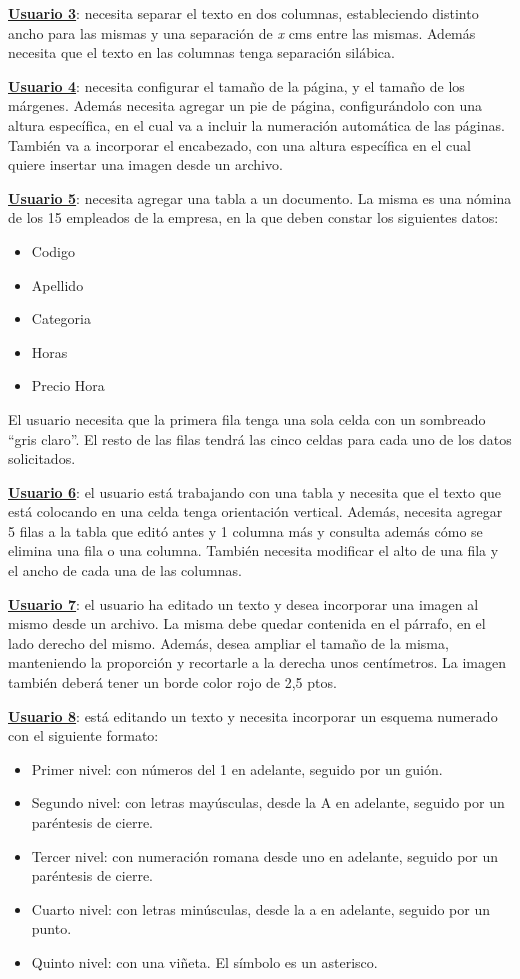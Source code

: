 \documentclass[12pt]{article}
\begin{document}
\textbf{\underline{Usuario 3}}: necesita separar el texto en dos columnas, estableciendo distinto ancho para las mismas y una separación de \textit{x} cms entre las mismas. Además necesita que el texto en las columnas tenga separación silábica.

\textbf{\underline{Usuario 4}}: necesita configurar el tamaño de la página, y el tamaño de los márgenes. Además necesita agregar un pie de página, configurándolo con una altura específica, en el cual va a incluir la numeración automática de las páginas. También va a incorporar el encabezado, con una altura específica en el cual quiere insertar una imagen desde un archivo.

\textbf{\underline{Usuario 5}}: necesita agregar una tabla a un documento. La misma es una nómina de los 15 empleados de la empresa, en la que deben constar los siguientes datos:
\begin{itemize}
\item Codigo 
\item Apellido 
\item Categoria 
\item Horas 
\item Precio Hora 
\end{itemize}
El usuario necesita que la primera fila tenga una sola celda con un sombreado “gris claro”. El resto de las filas tendrá las cinco celdas para cada uno de los datos solicitados.

\textbf{\underline{Usuario 6}}: el usuario está trabajando con una tabla y necesita que el texto que está colocando en una celda tenga orientación vertical. Además, necesita agregar 5 filas a la tabla que editó antes y 1 columna más y consulta además cómo se elimina una fila o una columna. También necesita modificar el alto de una fila y el ancho de cada una de las columnas.

\textbf{\underline{Usuario 7}}: el usuario ha editado un texto y desea incorporar una imagen al mismo desde un archivo. La misma debe quedar contenida en el párrafo, en el lado derecho del mismo. Además, desea ampliar el tamaño de la misma, manteniendo la proporción y recortarle a la derecha unos centímetros. La imagen también deberá tener un borde color rojo de 2,5 ptos.

\textbf{\underline{Usuario 8}}: está editando un texto y necesita incorporar un esquema numerado con el siguiente formato: 
\begin{itemize}
\item Primer nivel: con números del 1 en adelante, seguido por un guión.
\item Segundo nivel: con letras mayúsculas, desde la A en adelante, seguido por un paréntesis de cierre.
\item Tercer nivel: con numeración romana desde uno en adelante, seguido por un paréntesis de cierre.
\item Cuarto nivel: con letras minúsculas, desde la a en adelante, seguido por un punto.
\item Quinto nivel: con una viñeta. El símbolo es un asterisco.
\end{itemize}
\end{document}
